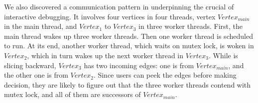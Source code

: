 We also discovered a communication pattern in  underpinning the
crucial of interactive debugging. It involves four vertices in four threads,
vertex $Vertex_{main}$ in the main thread, and $Vertex_1$ to $Vertex_3$ in
three worker threads. First, the main thread wakes up three worker threads.
Then one worker thread is scheduled to run. At its end, another worker thread,
which waits on mutex lock, is woken in $Vertex_2$, which in turn wakes up the
next worker thread in $Vertex_3$. While \xxx is slicing backward, $Vertex_3$
has two incoming edges: one is from $Vertex_{main}$, and the other one is from
$Vertex_2$. Since users can peek the edges before making decision, they are
likely to figure out that the three worker threads contend with mutex lock, and
all of them are successors of $Vertex_{main}$.

